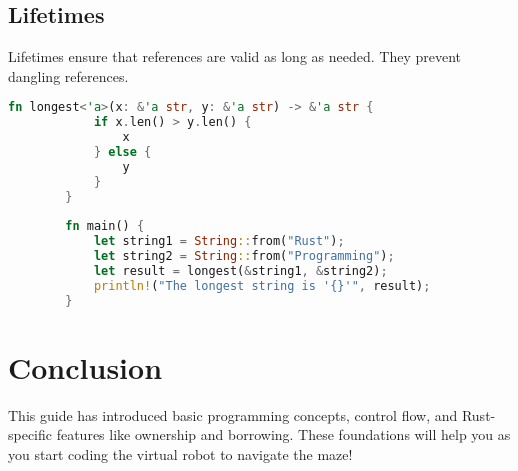 \documentclass{article}
\begin{document}
	\subsection*{Lifetimes}
	Lifetimes ensure that references are valid as long as needed. They prevent dangling references.
	
	\begin{lstlisting}[language=Rust, caption={Lifetimes in Rust}]
		fn longest<'a>(x: &'a str, y: &'a str) -> &'a str {
			if x.len() > y.len() {
				x
			} else {
				y
			}
		}
		
		fn main() {
			let string1 = String::from("Rust");
			let string2 = String::from("Programming");
			let result = longest(&string1, &string2);
			println!("The longest string is '{}'", result);
		}
	\end{lstlisting}
	
	\section*{Conclusion}
	This guide has introduced basic programming concepts, control flow, and Rust-specific features like ownership and borrowing. These foundations will help you as you start coding the virtual robot to navigate the maze!
	
\end{document}
